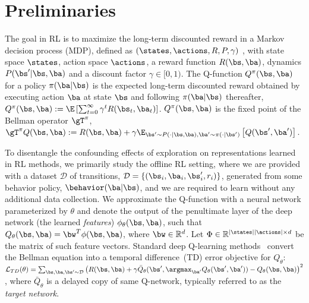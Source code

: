 \vspace{-4pt}
\section{Preliminaries}
\vspace{-5pt}
\label{prelim}
The goal in RL is to maximize the long-term discounted reward in a Markov decision process (MDP), defined as $(\states, \actions, R, P, \gamma)$ \citep{puterman1994markov}, with state space $\states$, action space $\actions$, a reward function $R(\bs, \ba)$, dynamics $P(\bs' | \bs, \ba)$ and a discount factor $\gamma \in [0, 1)$. The Q-function $Q^\pi(\bs, \ba)$ for a policy $\pi(\ba|\bs)$ is the expected long-term discounted reward obtained by executing action $\ba$ at state $\bs$ and following $\pi(\ba|\bs)$ thereafter, 
$Q^\pi(\bs, \ba) := \E\left[ \sum\nolimits_{t=0}^\infty \gamma^t R(\bs_t, \ba_t) \right]$.
$Q^\pi(\bs, \ba)$ is the fixed point of the Bellman operator $\gT^{\pi}$, \mbox{$\gT^{\pi} Q(\bs, \ba) := 
R(\bs, \ba) + \gamma \E_{\bs' \sim P(\cdot|\bs, \ba), \ba' \sim \pi(\cdot|\bs')} \left[ Q(\bs', \ba')\right]$}. %

To disentangle the confounding effects of exploration on representations learned in RL methods, we primarily study the offline RL setting, where we are provided with a dataset $\mathcal{D}$ of transitions, $\mathcal{D} = \{(\bs_i, \ba_i, \bs'_i, r_i)\}$, generated from some behavior policy, $\behavior(\ba|\bs)$, and we are required to learn without any additional data collection. We approximate the Q-function with a neural network parameterized by $\theta$ and denote the output of the penultimate layer of the deep network (the learned \emph{features}) $\phi_\theta(\bs, \ba)$,
such that $Q_\theta(\bs, \ba) = \bw^T \phi(\bs, \ba)$, 
where $\bw \in \mathbb{R}^{d}$. Let $\Phi \in \mathbb{R}^{|\states| |\actions| \times d}$ be the matrix of such feature vectors. %
Standard deep Q-learning methods~\citep{Mnih2015,Haarnoja18} convert the Bellman equation into a temporal difference~(TD) error objective for $Q_\theta$: $\mathcal{L}_{TD}(\theta) = \sum_{\bs, \ba, \bs' \sim \mathcal{D}} \left(R(\bs, \ba) + \gamma \bar{Q}_\theta(\bs', \argmax_{\ba'} Q_\theta(\bs', \ba')) - Q_\theta(\bs, \ba) \right)^2$, where $\bar{Q}_\theta$ is a delayed copy of same Q-network, typically referred to as the \emph{target network}. 

